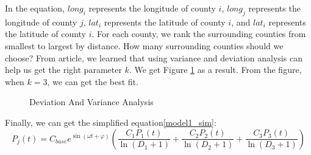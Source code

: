 \documentclass{mcmthesis}
\begin{document}
In the equation, $long_i$ represents the longitude of county $i$, $long_j$ represents the longitude of county $j$, $lat_i$ represents the latitude of county $i$, and $lat_i$ represents the latitude of county $i$. For each county, we rank the surrounding counties from smallest to largest by distance. How many surrounding counties should we choose? From article\cite{}, we learned that using variance and deviation analysis can help us get the right parameter $k$. We get Figure \ref{model1_deviation_variance} as a result. From the figure, when $k = 3$, we can get the best fit.
\begin{figure}[ht]
	\centering
	\caption{Deviation And Variance Analysis}\label{model1_deviation_variance}	
\end{figure}

Finally, we can get the simplified equation\eqref{model1_sim}:
\begin{equation}
P_{j}(t) = C_{base} e^{\sin (\omega t+\varphi)} \left(\frac{C_1 P_1(t)}{\ln (D_1+1)}+\frac{C_2 P_2(t)}{\ln (D_2+1)}+\frac{C_3 P_3(t)}{\ln (D_3+1)}\right)
\label{model1_sim}
\end{equation}
\end{document}
